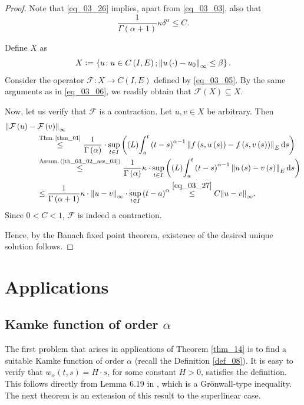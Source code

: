 \documentclass[reqno]{amsart}
\numberwithin{equation}{section}
\theoremstyle{definition}
\theoremstyle{remark}
\newcommand{\assumRef}[1]{\textrm{Assum.\,}\br{\textrm{\ref{#1}}}}
\newcommand{\br}[1]{\left(#1\right)}
\newcommand{\C}[2]{C\br{#1,#2}}
\newcommand{\cbr}[1]{\left\{#1\right\}}
\newcommand{\definitionRef}[1]{\textrm{Definition \ref{#1}}}
\newcommand{\defeq}{\vcentcolon=}
\newcommand{\ds}{\mathrm{d}s}
\newcommand{\fF}{\mathcal{F}}
\newcommand{\leqText}[1]{\stackrel{#1}{\leq}}
\newcommand{\Lint}[3]{\br{L}\!\displaystyle\int_{#1}^{#2}{#3}}
\newcommand{\st}{\!:}
\newcommand{\theoremRef}[1]{\textrm{Theorem \ref{#1}}}
\newcommand{\thmRef}[1]{\textrm{Thm.\,\ref{#1}}}
\begin{document}
	\begin{proof}
	Note that \eqref{eq_03_26} implies, apart from \eqref{eq_03_03}, also that
	\begin{equation}\label{eq_03_27}
		\frac{1}{\Gamma\br{\alpha+1}}\kappa\delta^{\alpha}\leq{C}.
	\end{equation}
	
	Define $X$ as
	\begin{equation*}
		X\defeq\cbr{u\st{u}\in\C{I}{E};\norm{u\br{\cdot}-u_0}_{\infty}\leq\beta}.
	\end{equation*}
	Consider the operator $\fF\st{X}\rightarrow\C{I}{E}$ defined by \eqref{eq_03_05}. By the same arguments as in \eqref{eq_03_06}, we readily obtain that $\fF\br{X}\subseteq{X}$.
	
	Now, let us verify that $\fF$ is a contraction. Let $u,v\in{X}$ be arbitrary. Then
	\begin{equation*}
		\begin{aligned}
			&\norm{\fF\br{u}-\fF\br{v}}_{\infty}\\
			&\qquad\qquad\leqText{\thmRef{thm_01}}\frac{1}{\Gamma\br{\alpha}}\cdot\sup_{t\in{I}}\br{\Lint{a}{t}{\br{t-s}^{\alpha-1}\norm{f\br{s,u\br{s}}-f\br{s,v\br{s}}}_E\,\ds}}\\
			&\qquad\qquad\leqText{\assumRef{th_03_02_ass_03}}\frac{1}{\Gamma\br{\alpha}}\kappa\cdot\sup_{t\in{I}}\br{\Lint{a}{t}{\br{t-s}^{\alpha-1}\norm{u\br{s}-v\br{s}}_E\,\ds}}\\
			&\qquad\qquad\leq\frac{1}{\Gamma\br{\alpha+1}}\kappa\cdot\norm{u-v}_{\infty}\cdot\sup_{t\in{I}}\br{t-a}^{\alpha}\leqText{\eqref{eq_03_27}}C\norm{u-v}_{\infty}.
		\end{aligned}
	\end{equation*}
	Since $0<C<1$, $\fF$ is indeed a contraction.
	
	Hence, by the Banach fixed point theorem, existence of the desired unique solution follows.
	\end{proof}

	\section{Applications}\label{sec_04}
	\setcounter{section}{4}
	\setcounter{equation}{0}
	\subsection{Kamke function of order $\alpha$}
	The first problem that arises in applications of \theoremRef{thm_14} is to find a suitable Kamke function of order $\alpha$ (recall the \definitionRef{def_08}). It is easy to verify that $w_{\alpha}\br{t,s}=H\cdot{s}$, for some constant $H>0$, satisfies the definition. This follows directly from Lemma $6.19$ in \cite{Diethelm}, which is a Grönwall-type inequality. The next theorem is an extension of this result to the superlinear case.
	
\end{document}
